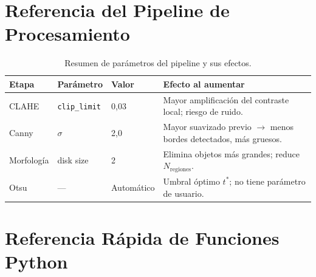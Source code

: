 \documentclass[12pt,a4paper]{article}
\begin{document}
\section{Referencia del Pipeline de Procesamiento}
\label{sec:appendix_pipeline}

\begin{table}[H]
	\centering
	\caption{Resumen de parámetros del pipeline y sus efectos.}
	\label{tab:parametros_pipeline}
	\small
	\begin{tabularx}{\textwidth}{l l l X}
		\toprule
		\textbf{Etapa} & \textbf{Parámetro}                                                 & \textbf{Valor}
		               & \textbf{Efecto al aumentar}                                                         \\
		\midrule
		CLAHE          & \texttt{clip\_limit}                                               & 0,03
		               & Mayor amplificación del contraste local; riesgo de ruido.                           \\
		Canny          & $\sigma$                                                           & 2,0
		               & Mayor suavizado previo $\to$ menos bordes detectados, más gruesos.                  \\
		Morfología     & disk size                                                          & 2
		               & Elimina objetos más grandes; reduce $N_\mathrm{regiones}$.                          \\
		Otsu           & ---                                                                & Automático
		               & Umbral óptimo $t^*$; no tiene parámetro de usuario.                                 \\
		\bottomrule
	\end{tabularx}
\end{table}

\section{Referencia Rápida de Funciones Python}
\label{sec:appendix_python}
\end{document}
